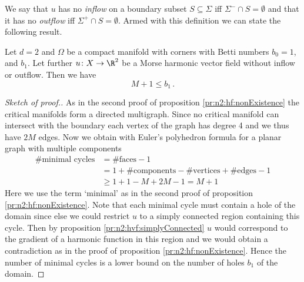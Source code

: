 We say that $u$ has no \emph{inflow} on a boundary subset $S\subseteq\Sigma$ iff $\Sigma^-\cap S=\emptyset$ and
that it has no \emph{outflow} iff $\Sigma^+\cap S=\emptyset$.
Armed with this definition we can state the following result.
\begin{proposition}
  Let $d=2$ and $\Omega$ be a compact manifold with corners with Betti numbers $b_0=1$, and $b_1$.
  Let further $u\colon X\to\R^2$ be 
  a Morse harmonic vector field without inflow or outflow.
  Then we have $$M+1\leq b_1\,.$$
\end{proposition}
\begin{proof}[Sketch of proof.]
  As in the second proof of proposition \ref{pr:n2:hf:nonExistence} the critical manifolds form a directed multigraph.
  Since no critical manifold can intersect with the boundary each vertex
  of the graph has degree 4 and we thus have $2M$ edges. Now we obtain with Euler's polyhedron formula
  for a planar graph with multiple components
  \begin{align*}
    \text{\# minimal cycles}
    &= \text{\#faces}-1 \\
    &= 1+\text{\#components}-\text{\#vertices}+\text{\#edges} -1 \\
    &\geq 1+1-M+2M -1 = M+1
  \end{align*}
  Here we use the term `minimal' as in the second proof of proposition \ref{pr:n2:hf:nonExistence}.
  Note that each minimal cycle must contain a hole of the domain since else we could restrict $u$ to a simply
  connected region containing this cycle. Then by proposition \ref{pr:n2:hvf:simplyConnected} $u$ would correspond to the gradient of 
  a harmonic function in this region and we would obtain a contradiction as in the proof of proposition \ref{pr:n2:hf:nonExistence}.
  Hence the number of minimal cycles is a lower bound on the number of holes $b_1$ of the domain.
\end{proof}

